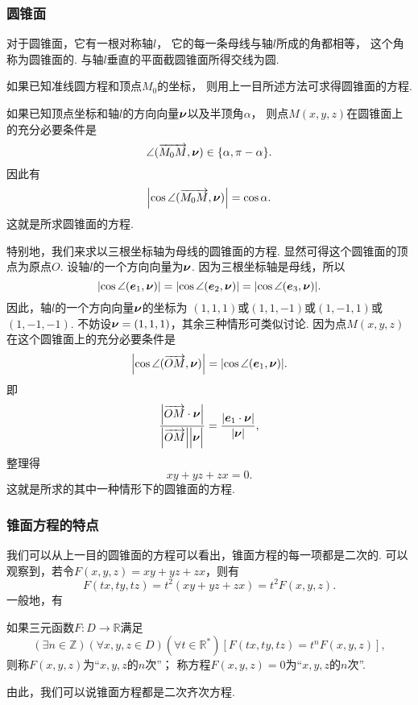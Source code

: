 \subsubsection{圆锥面}
对于圆锥面，它有一根对称轴\(l\)，
它的每一条母线与轴\(l\)所成的角都相等，
这个角称为圆锥面的.
与轴\(l\)垂直的平面截圆锥面所得交线为圆.

如果已知准线圆方程和顶点\(M_0\)的坐标，
则用上一目所述方法可求得圆锥面的方程.

如果已知顶点坐标和轴\(l\)的方向向量\(\boldsymbol{\nu}\)以及半顶角\(\alpha\)，
则点\(M(x,y,z)\)在圆锥面上的充分必要条件是\[
	\angle(\overrightarrow{M_0 M},\boldsymbol{\nu}) \in \{ \alpha, \pi - \alpha \}.
\]
因此有\begin{equation}
	\abs{\cos\angle(\overrightarrow{M_0 M},\boldsymbol{\nu})} = \cos\alpha.
\end{equation}
这就是所求圆锥面的方程.

特别地，我们来求以三根坐标轴为母线的圆锥面的方程.
显然可得这个圆锥面的顶点为原点\(O\).
设轴\(l\)的一个方向向量为\(\boldsymbol{\nu}\).
因为三根坐标轴是母线，所以\[
	\abs{\cos\angle(\boldsymbol{e}_1,\boldsymbol{\nu})}
	= \abs{\cos\angle(\boldsymbol{e}_2,\boldsymbol{\nu})}
	= \abs{\cos\angle(\boldsymbol{e}_3,\boldsymbol{\nu})}.
\]
因此，轴\(l\)的一个方向向量\(\boldsymbol{\nu}\)的坐标为
\((1,1,1)\)或\((1,1,-1)\)或\((1,-1,1)\)或\((1,-1,-1)\).
不妨设\(\boldsymbol{\nu}=(1,1,1)\)，其余三种情形可类似讨论.
因为点\(M(x,y,z)\)在这个圆锥面上的充分必要条件是\[
	\abs{\cos\angle(\overrightarrow{OM},\boldsymbol{\nu})}
	= \abs{\cos\angle(\boldsymbol{e}_1,\boldsymbol{\nu})}.
\]
即\[
	\frac{\abs{\vec{OM}\cdot\vb{\nu}}}{\abs{\vec{OM}}\abs{\vb{\nu}\vphantom{\vec{OM}}}}
	= \frac{\abs{\vb{e}_1\cdot\vb{\nu}}}{\abs{\vb{\nu}}},
\]
整理得\[
	xy+yz+zx=0.
\]
这就是所求的其中一种情形下的圆锥面的方程.

\subsubsection{锥面方程的特点}
我们可以从上一目的圆锥面的方程可以看出，锥面方程的每一项都是二次的.
可以观察到，若令\(F(x,y,z) = xy+yz+zx\)，则有\[
	F(tx,ty,tz) = t^2(xy+yz+zx)
	= t^2 F(x,y,z).
\]
一般地，有
\begin{definition}
如果三元函数\(F\colon D \to \mathbb{R}\)满足\[
	(\exists n\in\mathbb{Z})
	(\forall x,y,z \in D)
	(\forall t\in\mathbb{R}^*)
	[F(tx,ty,tz) = t^n F(x,y,z)],
\]
则称\(F(x,y,z)\)为“\(x,y,z\)的\(n\)次”；
称方程\(F(x,y,z)=0\)为“\(x,y,z\)的\(n\)次”.
\end{definition}

由此，我们可以说锥面方程都是二次齐次方程.

